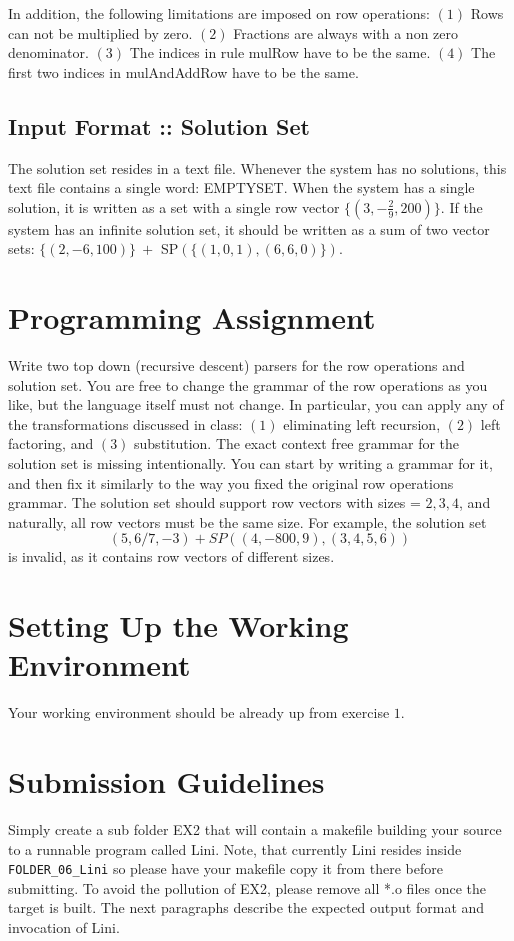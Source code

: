 \documentclass{article}
\begin{document}
In addition, the following limitations are imposed on row operations:
$(1)$ Rows can not be multiplied by zero.
$(2)$ Fractions are always with a non zero denominator.
$(3)$ The indices in rule mulRow have to be the same.
$(4)$ The first two indices in mulAndAddRow have to be the same.

\subsection*{Input Format :: Solution Set}
The solution set resides in a text file.
Whenever the system has no solutions, this text file contains a single word:
EMPTYSET. When the system has a single solution, it is written as a set 
with a single row vector $\{(3,-\frac{2}{9},200)\}$. If the system has an infinite
solution set, it should be written as a sum of two vector sets:
$\{(2,-6,100)\} ~ +$ SP$(\{(1,0,1), (6,6,0)\})$.

\section{Programming Assignment}
Write two top down (recursive descent) parsers for the row operations and solution set.
You are free to change the grammar of the row operations as you like,
but the language itself must not change. In particular, you can apply any of the transformations discussed in class:
$(1)$ eliminating left recursion,
$(2)$ left factoring, and
$(3)$ substitution.
The exact context free grammar for the solution set is missing intentionally.
You can start by writing a grammar for it, and then fix it similarly
to the way you fixed the original row operations grammar.
The solution set should support row vectors with sizes = $2,3,4$,
and naturally, all row vectors must be the same size.
For example, the solution set
\[
{(5,6/7,-3)}+SP({(4,-800,9),(3,4,5,6)})
\]
is invalid, as it contains row vectors of different sizes.

\section{Setting Up the Working Environment}
Your working environment should be already up from exercise $1$.

\section{Submission Guidelines}
Simply create a sub folder EX2 that will contain a makefile building
your source to a runnable program called Lini.
Note, that currently Lini resides inside \verb"FOLDER_06_Lini" so please have your makefile copy it from there before submitting.
To avoid the pollution of EX2, please remove all *.o files once the target is built.
The next paragraphs describe the expected output format and invocation of Lini.
\end{document}
